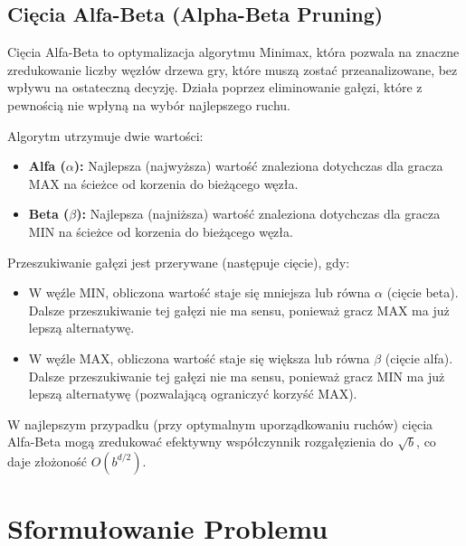 \documentclass[11pt,a4paper]{article}
\begin{document}
\subsection{Cięcia Alfa-Beta (Alpha-Beta Pruning)}
Cięcia Alfa-Beta to optymalizacja algorytmu Minimax, która pozwala na znaczne zredukowanie liczby węzłów drzewa gry, które muszą zostać przeanalizowane, bez wpływu na ostateczną decyzję. Działa poprzez eliminowanie gałęzi, które z pewnością nie wpłyną na wybór najlepszego ruchu.

Algorytm utrzymuje dwie wartości:
\begin{itemize}
    \item \textbf{Alfa ($\alpha$):} Najlepsza (najwyższa) wartość znaleziona dotychczas dla gracza MAX na ścieżce od korzenia do bieżącego węzła.
    \item \textbf{Beta ($\beta$):} Najlepsza (najniższa) wartość znaleziona dotychczas dla gracza MIN na ścieżce od korzenia do bieżącego węzła.
\end{itemize}
Przeszukiwanie gałęzi jest przerywane (następuje cięcie), gdy:
\begin{itemize}
    \item W węźle MIN, obliczona wartość staje się mniejsza lub równa $\alpha$ (cięcie beta). Dalsze przeszukiwanie tej gałęzi nie ma sensu, ponieważ gracz MAX ma już lepszą alternatywę.
    \item W węźle MAX, obliczona wartość staje się większa lub równa $\beta$ (cięcie alfa). Dalsze przeszukiwanie tej gałęzi nie ma sensu, ponieważ gracz MIN ma już lepszą alternatywę (pozwalającą ograniczyć korzyść MAX).
\end{itemize}
W najlepszym przypadku (przy optymalnym uporządkowaniu ruchów) cięcia Alfa-Beta mogą zredukować efektywny współczynnik rozgałęzienia do $\sqrt{b}$, co daje złożoność $O(b^{d/2})$.

\section{Sformułowanie Problemu}
\end{document}
